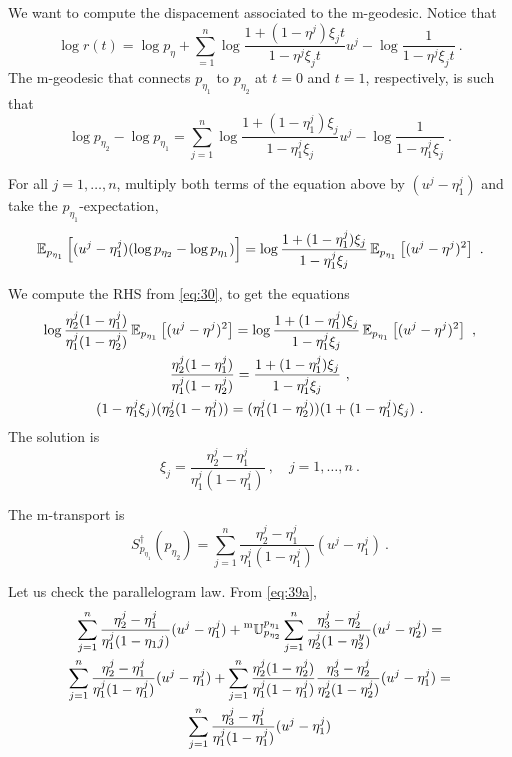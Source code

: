 \documentclass[12pt,a4paper]{amsart}
\theoremstyle{remark}
\begin{document}
We want to compute the dispacement associated to the m-geodesic. Notice that
\begin{equation}
  \label{eq:45}
   \log r(t) = \log p_\eta + \sum_{=1}^n \log \frac{1 + (1-\eta^j) \xi_j t}{1 -\eta^j\xi_j t} u^j - \log \frac1{1 -\eta^j\xi_j t} \ . 
 \end{equation}
 The m-geodesic that connects $p_{\eta_1}$ to $p_{\eta_2}$ at $t=0$ and $t=1$, respectively, is such that
 \begin{equation}
   \label{eq:46}
   \log p_{\eta_2} - \log p_{\eta_1} = \sum_{j=1}^n \log \frac{1 + (1-\eta^j_1) \xi_j}{1 -\eta^j_1\xi_j} u^j - \log \frac1{1 -\eta^j_1\xi_j} \ .
 \end{equation}
 
 For all $j = 1,\dots,n$, multiply both terms of the equation above by $(u^j - \eta_1^j)$ and take the $p_{\eta_1}$-expectation,
 \begin{equation}
   \label{eq:43}
   \operatorname{\mathbb E}_{p_{\eta_1}}\left[(u^j-\eta^j_1)(\log p_{\eta_2} - \log p_{\eta_1})\right] = \log \frac{1 + (1-\eta^j_1) \xi_j}{1 -\eta^j_1\xi_j} \operatorname{\mathbb E}_{p_{\eta_1}}\left[(u^j - \eta^j)^2\right] \ .
 \end{equation}
 
 We compute the RHS from \cref{eq:30}, to get the equations
 \begin{gather}
   \label{eq:47}
   \log \frac {\eta^j_2(1 - \eta^j_1)}{\eta^j_1 (1- \eta^j_2)} \operatorname{\mathbb E}_{p_{\eta_1}}\left[(u^j - \eta^j)^2\right] = \log \frac{1 + (1-\eta^j_1) \xi_j}{1 -\eta^j_1\xi_j} \operatorname{\mathbb E}_{p_{\eta_1}}\left[(u^j - \eta^j)^2\right] \ , \\
   \frac {\eta^j_2(1 - \eta^j_1)}{\eta^j_1 (1- \eta^j_2)} = \frac{1 + (1-\eta^j_1) \xi_j}{1 -\eta^j_1\xi_j} \ , \\
 (1 -\eta^j_1\xi_j)(\eta^j_2(1 - \eta^j_1)) = (\eta^j_1 (1- \eta^j_2))(1 + (1-\eta^j_1) \xi_j) \ .
 \end{gather}
The solution is
\begin{equation}
  \label{eq:52}
  \xi_j = \frac{\eta^j_2-\eta^j_1}{\eta^j_1(1-\eta^j_1)} \ , \quad j=1,\dots,n \ .
\end{equation}

The m-transport is
\begin{equation}
  \label{eq:53}
  S^\dagger _{p_{\eta_1}}(p_{\eta_2}) = \sum_{j=1}^n \frac{\eta^j_2-\eta^j_1}{\eta^j_1(1-\eta^j_1)} (u^j - \eta^j_1) \ . 
\end{equation}

 Let us check the parallelogram law. From \cref{eq:39a},
 \begin{multline}
   \label{eq:48}
   \sum_{j=1}^n \frac{\eta^j_2-\eta_1^j}{\eta_1^j(1-\eta_1j)}(u^j-\eta_1^j) + \prescript{\text{m}}{} {\mathbb U} _ {p_{\eta_2}} ^ {p_{\eta_1}} \sum_{j=1}^n \frac{\eta^j_3-\eta_2^j}{\eta_2^j(1-\eta_2^y)}(u^j-\eta_2^j) = \\
   \sum_{j=1}^n \frac{\eta^j_2-\eta_1^j}{\eta_1^j(1-\eta_1^j)}(u^j-\eta_1^j) + \sum_{j=1}^n  \frac{\eta^j_2(1-\eta^j_2)} {\eta^j_1(1-\eta^j_1)} \frac{\eta^j_3-\eta_2^j}{\eta_2^j(1-\eta_2^j)}(u^j-\eta_1^j) = \\
   \sum_{j=1}^n \frac{\eta^j_3-\eta_1^j}{\eta_1^j(1-\eta_1^j)}(u^j-\eta_1^j) 
 \end{multline}
\end{document}
